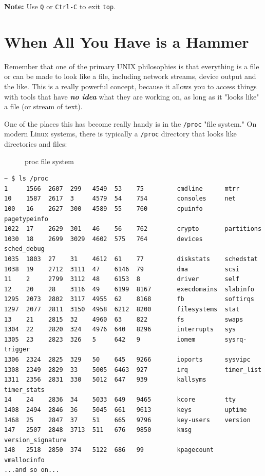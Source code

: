 \documentclass[10pt,]{book}
\numberwithin{figure}{chapter}
\DeclareRobustCommand{\drcap}[1]{\begin{figure}[H]\caption{#1}\end{figure}}
\begin{document}
\textbf{Note:} Use \texttt{Q} or \texttt{Ctrl-C} to exit \texttt{top}.

\section*{When All You Have is a
Hammer}\label{when-all-you-have-is-a-hammer}

Remember that one of the primary UNIX philosophies is that everything is
a file or can be made to look like a file, including network streams,
device output and the like. This is a really powerful concept, because
it allows you to access things with tools that have \textbf{\emph{no
idea}} what they are working on, as long as it "looks like" a file (or
stream of text).

One of the places this has become really handy is in the
\texttt{/proc} "file system." On modern Linux
systems, there is typically a \texttt{/proc} directory that looks like
directories and files:

\drcap{proc file system}

\begin{verbatim}
~ $ ls /proc
1     1566  2607  299   4549  53    75         cmdline      mtrr
10    1587  2617  3     4579  54    754        consoles     net
100   16    2627  300   4589  55    760        cpuinfo      pagetypeinfo
1022  17    2629  301   46    56    762        crypto       partitions
1030  18    2699  3029  4602  575   764        devices      sched_debug
1035  1803  27    31    4612  61    77         diskstats    schedstat
1038  19    2712  3111  47    6146  79         dma          scsi
11    2     2799  3112  48    6153  8          driver       self
12    20    28    3116  49    6199  8167       execdomains  slabinfo
1295  2073  2802  3117  4955  62    8168       fb           softirqs
1297  2077  2811  3150  4958  6212  8200       filesystems  stat
13    21    2815  32    4960  63    822        fs           swaps
1304  22    2820  324   4976  640   8296       interrupts   sys
1305  23    2823  326   5     642   9          iomem        sysrq-trigger
1306  2324  2825  329   50    645   9266       ioports      sysvipc
1308  2349  2829  33    5005  6463  927        irq          timer_list
1311  2356  2831  330   5012  647   939        kallsyms     timer_stats
14    24    2836  34    5033  649   9465       kcore        tty
1408  2494  2846  36    5045  661   9613       keys         uptime
1468  25    2847  37    51    665   9796       key-users    version
147   2507  2848  3713  511   676   9850       kmsg         version_signature
148   2518  2850  374   5122  686   99         kpagecount   vmallocinfo
...and so on...
\end{verbatim}
\end{document}
